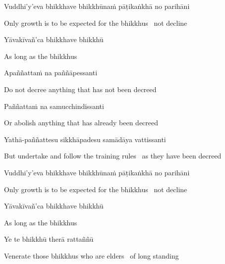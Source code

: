 \begin{pali-hang}
Vuddhi'y'eva bhikkhave bhikkhūnaṁ pāṭikaṅkhā no parihāni
\end{pali-hang}

\begin{english-hang}
  Only growth is to be expected for the bhikkhus \breathmark\ not decline
\end{english-hang}

Yāvakīvañ'ca bhikkhave bhikkhū

\begin{english}
  As long as the bhikkhus
\end{english}

Apaññattaṁ na paññāpessanti

\begin{english}
  Do not decree anything that has not been decreed
\end{english}

Paññattaṁ na samucchindissanti

\begin{english}
  Or abolish anything that has already been decreed
\end{english}

Yathā-paññattesu sikkhāpadesu samādāya vattissanti

\begin{english-hang}
  But undertake and follow the training rules \breathmark\ as they have been decreed
\end{english-hang}

\begin{pali-hang}
Vuddhi'y'eva bhikkhave bhikkhūnaṁ pāṭikaṅkhā no parihāni
\end{pali-hang}

\begin{english-hang}
  Only growth is to be expected for the bhikkhus \breathmark\ not decline
\end{english-hang}

Yāvakīvañ'ca bhikkhave bhikkhū

\begin{english}
  As long as the bhikkhus
\end{english}

\ifninebythirteen\clearpage\fi

Ye te bhikkhū therā rattaññū

\begin{english-hang}
  Venerate those bhikkhus who are elders \breathmark\ of long standing
\end{english-hang}

